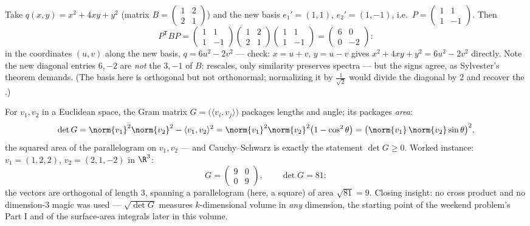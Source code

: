 \begin{example}\label{ex:b2:quadratic:congruence}
Take $q(x, y) = x^2 + 4xy + y^2$ (matrix $B = \begin{pmatrix} 1
& 2\\ 2 & 1\end{pmatrix}$) and the new basis $e_1' = (1, 1)$,
$e_2' = (1, -1)$, i.e.\ $P = \begin{pmatrix} 1 & 1\\ 1 &
-1\end{pmatrix}$. Then
\[
P^{\mathsf T}BP
= \begin{pmatrix} 1 & 1\\ 1 & -1\end{pmatrix}
\begin{pmatrix} 1 & 2\\ 2 & 1\end{pmatrix}
\begin{pmatrix} 1 & 1\\ 1 & -1\end{pmatrix}
= \begin{pmatrix} 6 & 0\\ 0 & -2\end{pmatrix} :
\]
in the coordinates $(u, v)$ along the new basis, $q = 6u^2 -
2v^2$ --- check: $x = u + v$, $y = u - v$ gives $x^2 + 4xy +
y^2 = 6u^2 - 2v^2$ directly. Note the new diagonal entries $6,
-2$ are \emph{not} the  $3, -1$ of $B$: 
rescales, only similarity preserves spectra --- but the signs
agree, as Sylvester's theorem demands. (The basis here is
orthogonal but not orthonormal; normalizing it by
$\frac{1}{\sqrt2}$ would divide the diagonal by $2$ and
recover the .)
\end{example}

\begin{example}\label{ex:b2:quadratic:gramarea}
For $v_1, v_2$ in a Euclidean space, the Gram matrix $G =
\bigl(\langle v_i, v_j\rangle\bigr)$ packages lengths and
angle; its  packages \emph{area}:
\[
\det G = \norm{v_1}^2\norm{v_2}^2 - \langle v_1, v_2\rangle^2
= \norm{v_1}^2\norm{v_2}^2\bigl(1 - \cos^2\theta\bigr)
= \bigl(\norm{v_1}\,\norm{v_2}\sin\theta\bigr)^2 ,
\]
the squared area of the parallelogram on $v_1, v_2$ ---
and Cauchy--Schwarz is exactly the statement $\det G \geq 0$.
Worked instance: $v_1 = (1, 2, 2)$, $v_2 = (2, 1, -2)$ in
$\R^3$:
\[
G = \begin{pmatrix} 9 & 0\\ 0 & 9 \end{pmatrix},
\qquad
\det G = 81 :
\]
the vectors are orthogonal of length $3$, spanning a
parallelogram (here, a square) of area $\sqrt{81} = 9$.
Closing insight: no cross product and no dimension-$3$ magic
was used --- $\sqrt{\det G}$ measures $k$-dimensional volume
in \emph{any} dimension, the starting point of the weekend
problem's Part I and of the surface-area integrals later in
this volume.
\end{example}


